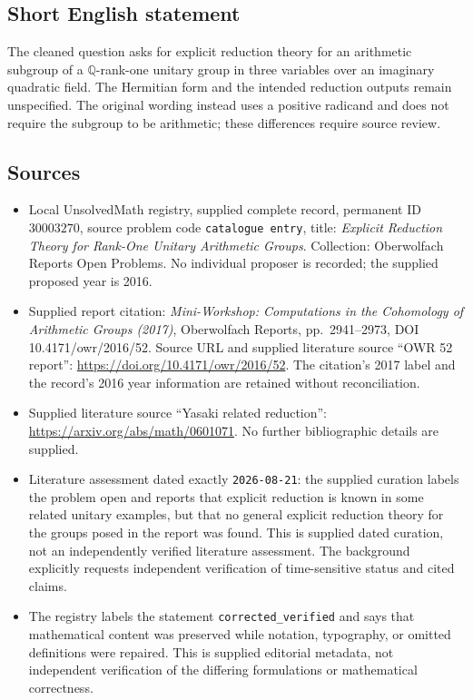 \documentclass[11pt]{article}
\newcommand{\Q}{\mathbb{Q}}
\begin{document}
\subsection{Short English statement}
The cleaned question asks for explicit reduction theory for an arithmetic subgroup of a \(\Q\)-rank-one unitary group in three variables over an imaginary quadratic field. The Hermitian form and the intended reduction outputs remain unspecified. The original wording instead uses a positive radicand and does not require the subgroup to be arithmetic; these differences require source review.
\subsection{Sources}
\begin{itemize}
\item Local UnsolvedMath registry, supplied complete record, permanent ID \(30003270\), source problem code \texttt{catalogue entry}, title: \emph{Explicit Reduction Theory for Rank-One Unitary Arithmetic Groups}. Collection: Oberwolfach Reports Open Problems. No individual proposer is recorded; the supplied proposed year is 2016.
\item Supplied report citation: \emph{Mini-Workshop: Computations in the Cohomology of Arithmetic Groups (2017)}, Oberwolfach Reports, pp.\ 2941--2973, DOI 10.4171/owr/2016/52. Source URL and supplied literature source ``OWR 52 report'': \url{https://doi.org/10.4171/owr/2016/52}. The citation's 2017 label and the record's 2016 year information are retained without reconciliation.
\item Supplied literature source ``Yasaki related reduction'': \url{https://arxiv.org/abs/math/0601071}. No further bibliographic details are supplied.
\item Literature assessment dated exactly \texttt{2026-08-21}: the supplied curation labels the problem open and reports that explicit reduction is known in some related unitary examples, but that no general explicit reduction theory for the groups posed in the report was found. This is supplied dated curation, not an independently verified literature assessment. The background explicitly requests independent verification of time-sensitive status and cited claims.
\item The registry labels the statement \texttt{corrected\_verified} and says that mathematical content was preserved while notation, typography, or omitted definitions were repaired. This is supplied editorial metadata, not independent verification of the differing formulations or mathematical correctness.
\end{itemize}
\end{document}
